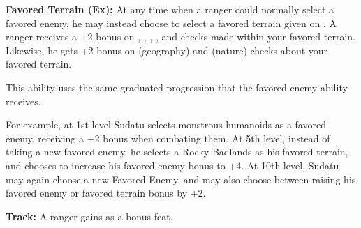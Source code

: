 \textbf{Favored Terrain (Ex):} At any time when a ranger could normally select a favored enemy, he may instead choose to select a favored terrain given on . A ranger receives a +2 bonus on , , , ,  and  checks made within your favored terrain. Likewise, he gets +2 bonus on  (geography) and  (nature) checks about your favored terrain.

This ability uses the same graduated progression that the favored enemy ability receives.

For example, at 1st level Sudatu selects monstrous humanoids as a favored enemy, receiving a +2 bonus when combating them. At 5th level, instead of taking a new favored enemy, he selects a Rocky Badlands as his favored terrain, and chooses to increase his favored enemy bonus to +4. At 10th level, Sudatu may again choose a new Favored Enemy, and may also choose between raising his favored enemy or favored terrain bonus by +2.

\textbf{Track:} A ranger gains  as a bonus feat.


